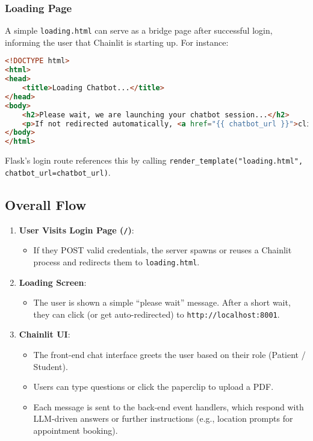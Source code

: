 \subsubsection{Loading Page}

A simple \texttt{loading.html} can serve as a bridge page after successful login, informing the user that Chainlit is starting up. For instance:

\begin{lstlisting}[language=HTML, caption={loading.html (Flask Template)}, basicstyle=\small\ttfamily]
<!DOCTYPE html>
<html>
<head>
    <title>Loading Chatbot...</title>
</head>
<body>
    <h2>Please wait, we are launching your chatbot session...</h2>
    <p>If not redirected automatically, <a href="{{ chatbot_url }}">click here</a>.</p>
</body>
</html>
\end{lstlisting}

\noindent
Flask’s login route references this by calling \texttt{render\_template("loading.html", chatbot\_url=chatbot\_url)}.

\subsection{Overall Flow}

\begin{enumerate}
    \item \textbf{User Visits Login Page (\texttt{/})}:
    \begin{itemize}
        \item If they POST valid credentials, the server spawns or reuses a Chainlit process and redirects them to \texttt{loading.html}.
    \end{itemize}
    \item \textbf{Loading Screen}:
    \begin{itemize}
        \item The user is shown a simple “please wait” message. After a short wait, they can click (or get auto-redirected) to \texttt{http://localhost:8001}.
    \end{itemize}
    \item \textbf{Chainlit UI}:
    \begin{itemize}
        \item The front-end chat interface greets the user based on their role (Patient / Student).
        \item Users can type questions or click the paperclip to upload a PDF. 
        \item Each message is sent to the back-end event handlers, which respond with LLM-driven answers or further instructions (e.g., location prompts for appointment booking).
    \end{itemize}
\end{enumerate}

